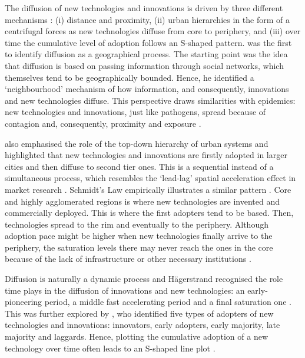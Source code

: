 \documentclass[
  authoryear,
  preprint,
  3p]{elsarticle}
\begin{document}
The diffusion of new technologies and innovations is driven by three
different mechanisms \citep{grubler1990rise, morrill2020spatial}: (i)
distance and proximity, (ii) urban hierarchies in the form of a
centrifugal forces as new technologies diffuse from core to periphery,
and (iii) over time the cumulative level of adoption follows an S-shaped
pattern. \citet{hagerstrand1968innovation} was the first to identify
diffusion as a geographical process. The starting point was the idea
that diffusion is based on passing information through social networks,
which themselves tend to be geographically bounded. Hence, he identified
a `neighbourhood' mechanism of how information, and consequently,
innovations and new technologies diffuse. This perspective draws
similarities with epidemics: new technologies and innovations, just like
pathogens, spread because of contagion and, consequently, proximity and
exposure \citep{hivner2003facilitating}.

\citet{hagerstrand1968innovation} also emphasised the role of the
top-down hierarchy of urban systems and highlighted that new
technologies and innovations are firstly adopted in larger cities and
then diffuse to second tier ones. This is a sequential instead of a
simultaneous process, which resembles the `lead-lag' spatial
acceleration effect in market research
\citep{bento2018time, PERES201091}. Schmidt's Law empirically
illustrates a similar pattern \citep{grubler1990rise}. Core and highly
agglomerated regions is where new technologies are invented and
commercially deployed. This is where the first adopters tend to be
based. Then, technologies spread to the rim and eventually to the
periphery. Although adoption pace might be higher when new technologies
finally arrive to the periphery, the saturation levels there may never
reach the ones in the core because of the lack of infrastructure or
other necessary institutions \citep{leibowicz2016representing}.

Diffusion is naturally a dynamic process and Hägerstrand recognised the
role time plays in the diffusion of innovations and new technologies: an
early-pioneering period, a middle fast accelerating period and a final
saturation one \citep{morrill2020spatial}. This was further explored by
\citet{rogers2010diffusion}, who identified five types of adopters of
new technologies and innovations: innovators, early adopters, early
majority, late majority and laggards. Hence, plotting the cumulative
adoption of a new technology over time often leads to an S-shaped line
plot \citep{grubler1990rise}.
\end{document}
